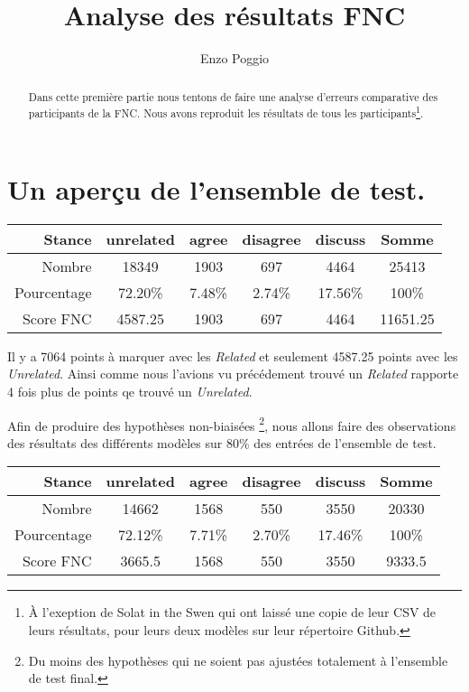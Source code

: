 \documentclass[onecolumn, 12pt]{article}
\title{Analyse des résultats FNC}
\author{Enzo Poggio}
\begin{document}
\maketitle{}


\begin{abstract}
 Dans cette première partie nous tentons de faire une analyse d'erreurs
 comparative des participants de la FNC. Nous avons reproduit les résultats de
 tous les participants\footnote{À l'exeption de Solat in the Swen qui ont laissé
  une copie de leur CSV de leurs résultats, pour leurs deux modèles sur leur
 répertoire Github.}.
\end{abstract}
\section{Un aperçu de l'ensemble de test.}
\begin{center}
 
 \begin{tabular}{ r | c c c c | c}
  Stance      & unrelated & agree  & disagree & discuss &          
  Somme    \\
  \hline
  Nombre      & 18349     & 1903   & 697      & 4464    & 25413    \\
  Pourcentage & 72.20\%   & 7.48\% & 2.74\%   & 17.56\% & 100\%    \\
  Score FNC   & 4587.25   & 1903   & 697      & 4464    & 11651.25 \\
 \end{tabular}
\end{center}

Il y a 7064 points à marquer avec les \textit{Related} et seulement 4587.25
points avec les \textit{Unrelated}.
Ainsi comme nous l'avions vu précédement trouvé
un \textit{Related} rapporte 4 fois plus de points qe trouvé un \textit{Unrelated}.

Afin de produire des hypothèses non-biaisées  \footnote{Du moins des hypothèses qui ne soient pas ajustées totalement à l'ensemble de test final.}, nous allons faire des observations des résultats des différents modèles sur 80\% des entrées de l'ensemble de test.

\begin{center}
 \begin{tabular}{ r | c c c c | c}
  Stance      & unrelated & agree  & disagree & discuss &        
  Somme    \\
  \hline
  Nombre      & 14662     & 1568   & 550      & 3550    & 20330  \\
  Pourcentage & 72.12\%   & 7.71\% & 2.70\%   & 17.46\% & 100\%  \\
  Score FNC   & 3665.5    & 1568   & 550      & 3550    & 9333.5 \\
 \end{tabular}
\end{center}
\end{document}

